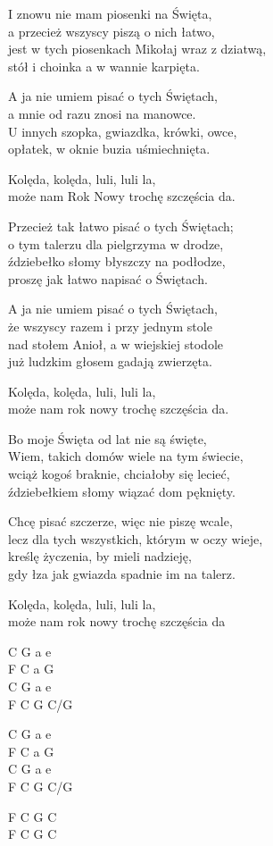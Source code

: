 \begin{text}
    I znowu nie mam piosenki na Święta,\\
    a przecież wszyscy piszą o nich łatwo,\\
    jest w tych piosenkach Mikołaj wraz z dziatwą,\\
    stół i choinka a w wannie karpięta.

    A ja nie umiem pisać o tych Świętach,\\
    a mnie od razu znosi na manowce.\\
    U innych szopka, gwiazdka, krówki, owce,\\
    opłatek, w oknie buzia uśmiechnięta.

    Kolęda, kolęda, luli, luli la,\\
    może nam Rok Nowy trochę szczęścia da.

    Przecież tak łatwo pisać o tych Świętach;\\
    o tym talerzu dla pielgrzyma w drodze,\\
    ździebełko słomy błyszczy na podłodze,\\
    proszę jak łatwo napisać o Świętach.

    A ja nie umiem pisać o tych Świętach,\\
    że wszyscy razem i przy jednym stole\\
    nad stołem Anioł, a w wiejskiej stodole\\
    już ludzkim głosem gadają zwierzęta.

    Kolęda, kolęda, luli, luli la,\\
    może nam rok nowy trochę szczęścia da.

    Bo moje Święta od lat nie są święte,\\
    Wiem, takich domów wiele na tym świecie,\\
    wciąż kogoś braknie, chciałoby się lecieć,\\
    ździebełkiem słomy wiązać dom pęknięty.

    Chcę pisać szczerze, więc nie piszę wcale,\\
    lecz dla tych wszystkich, którym w oczy wieje,\\
    kreślę życzenia, by mieli nadzieję,\\
    gdy łza jak gwiazda spadnie im na talerz.

    Kolęda, kolęda, luli, luli la,\\
    może nam rok nowy trochę szczęścia da
\end{text}
\begin{chord}
    C G a e\\
    F C a G\\
    C G a e\\
    F C G C/G

    C G a e\\
    F C a G\\
    C G a e\\
    F C G C/G

    F C G C\\
    F C G C
\end{chord}